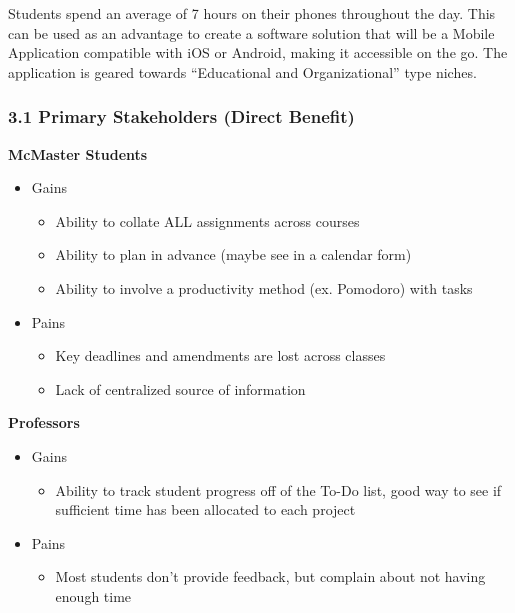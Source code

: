 \documentclass[11pt, oneside]{article}   	%
\begin{document}
Students spend an average of 7 hours on their phones throughout the day. This can be used as an advantage to create a software solution that will be a Mobile Application compatible with iOS or Android, making it accessible on the go. The application is geared towards “Educational and Organizational” type niches.

\newpage
\subsubsection*{3.1 Primary Stakeholders (Direct Benefit)}
\textbf{McMaster Students}
\begin{itemize}
\setlength\itemsep{1pt}
\item Gains
\begin{itemize}
\setlength\itemsep{1pt}
\item Ability to collate ALL assignments across courses 
\item Ability to plan in advance (maybe see in a calendar form)
\item Ability to involve a productivity method (ex. Pomodoro) with tasks
\end{itemize}

\item Pains
\begin{itemize}
\setlength\itemsep{1pt}
\item Key deadlines and amendments are lost across classes
\item Lack of centralized source of information
\end{itemize}
\end{itemize}

\textbf{Professors}
\begin{itemize}
\setlength\itemsep{1pt}
\item Gains
\begin{itemize}
\setlength\itemsep{1pt}
\item Ability to track student progress off of the To-Do list, good way to see if sufficient time has been allocated to each project
\end{itemize}

\item Pains
\begin{itemize}
\setlength\itemsep{1pt}
\item Most students don’t provide feedback, but complain about not having enough time
\end{itemize}
\end{itemize}
\end{document}
